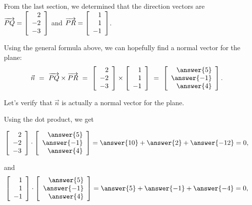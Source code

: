 \documentclass{ximera}
\begin{document}
\begin{example}
    From the last section, we determined that the direction vectors are $\longvect{PQ}=\startmat{r} 2 \\ -2 \\ -3 \stopmat$ and $\longvect{PR}=\startmat{r} 1 \\ 1 \\ -1 \stopmat$.
    
    Using the general formula above, we can hopefully find a normal vector for the
    plane:
    \begin{equation*}
      \vect{n}
      ~=~
      \longvect{PQ} \times \longvect{PR}
      ~=~
      \startmat{r} 2 \\ -2 \\ -3 \stopmat
      \times
      \startmat{r} 1 \\ 1 \\ -1 \stopmat
      ~=~
      \startmat{r} \answer{5} \\ \answer{-1} \\ \answer{4} \stopmat.
    \end{equation*}
    \begin{center}
    \end{center}

    Let's verify that $\vec{n}$ is actually a normal vector for the plane.

    Using the dot product, we get

    $$\startmat{r} 2 \\ -2 \\ -3 \stopmat\cdot \startmat{r} \answer{5} \\ \answer{-1} \\ \answer{4} \stopmat=\answer{10}+\answer{2}+\answer{-12}=0,$$

    and $$\startmat{r} 1 \\ 1 \\ -1 \stopmat\cdot \startmat{r} \answer{5} \\ \answer{-1} \\ \answer{4} \stopmat=\answer{5}+\answer{-1}+\answer{-4}=0,$$


\end{example}
\end{document}
